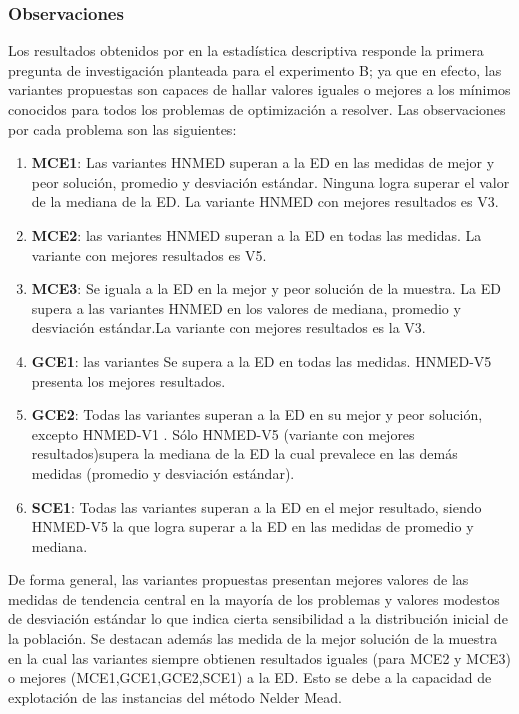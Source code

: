 \subsubsection{Observaciones}
Los resultados obtenidos por en la estadística descriptiva responde la primera pregunta de investigación planteada para el experimento B; ya que en efecto, las variantes propuestas son capaces de hallar valores iguales o mejores a los mínimos conocidos para todos los problemas de optimización a resolver. Las observaciones por cada problema son las siguientes:
\begin{enumerate}
	\item \textbf{MCE1}: Las variantes HNMED superan a la ED en las medidas de mejor y peor solución, promedio y desviación estándar. Ninguna logra superar el valor de la mediana de la ED. La variante HNMED con mejores resultados es V3.
	\item \textbf{MCE2}: las variantes HNMED superan a la ED en todas las medidas. La variante con mejores resultados es V5.
	\item \textbf{MCE3}: Se iguala a la ED en la mejor y peor solución de la muestra. La ED supera a las variantes HNMED en los valores de mediana, promedio y desviación estándar.La variante con mejores resultados es la V3.
	\item \textbf{GCE1}: las variantes Se supera a la ED en todas las medidas. HNMED-V5 presenta los mejores resultados.
	\item \textbf{GCE2}: Todas las variantes superan a la ED en su mejor y peor solución, excepto HNMED-V1 . Sólo HNMED-V5 (variante con mejores resultados)supera la mediana de la ED la cual prevalece en las demás medidas (promedio y desviación estándar).
	\item \textbf{SCE1}: Todas las variantes superan a la ED en el mejor resultado, siendo HNMED-V5 la que logra superar a la ED en las medidas de promedio y mediana. 
\end{enumerate}
De forma general, las variantes propuestas presentan mejores valores de las medidas de tendencia central en la mayoría de los problemas y valores modestos de desviación estándar lo que indica cierta sensibilidad a la distribución inicial de la población. Se destacan además las medida de la mejor solución de la muestra en la cual las variantes siempre obtienen resultados iguales (para MCE2 y MCE3) o mejores (MCE1,GCE1,GCE2,SCE1) a la ED. Esto se debe a la capacidad de explotación de las instancias del método Nelder Mead.

